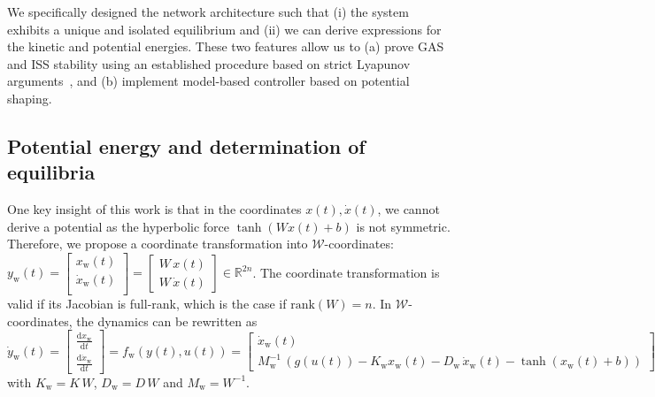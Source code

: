 We specifically designed the network architecture such that (i) the system exhibits a unique and isolated equilibrium and (ii) we can derive expressions for the kinetic and potential energies. These two features allow us to (a) prove \gls{GAS} and \gls{ISS} stability using an established procedure based on strict Lyapunov arguments~\cite{calzolari2020exponential, wu2022passive}, and (b) implement model-based controller based on potential shaping.

\subsection{Potential energy and determination of equilibria}

One key insight of this work is that in the coordinates $x(t), \dot{x}(t)$, we cannot derive a potential 
as the hyperbolic force $\tanh(W x(t) + b)$ is not symmetric. Therefore, we propose a coordinate transformation into $\mathcal{W}$-coordinates: $y_\mathrm{w}(t) = \begin{bmatrix}
    x_\mathrm{w}(t)\\
    \dot{x}_\mathrm{w}(t)\\
\end{bmatrix} = \begin{bmatrix}
    W \, x(t)\\
    W \, \dot{x}(t)
\end{bmatrix} \in \mathbb{R}^{2n}$. The coordinate transformation is valid if its Jacobian is full-rank, which is the case if $\mathrm{rank}(W) = n$.
In $\mathcal{W}$-coordinates, the dynamics can be rewritten as
\begin{equation}\label{eq:con:conw_dynamics}
    \dot{y}_\mathrm{w}(t) = \begin{bmatrix}
        \frac{\mathrm{d}x_\mathrm{w}}{\mathrm{d}t}\\
        \frac{\mathrm{d}\dot{x}_\mathrm{w}}{\mathrm{d}t}
    \end{bmatrix} = f_\mathrm{w}(y(t), u(t)) = \begin{bmatrix}
        \dot{x}_\mathrm{w}(t)\\
        M_\mathrm{w}^{-1} \, \left (g(u(t)) -K_\mathrm{w} x_\mathrm{w}(t) - D_\mathrm{w} \, \dot{x}_\mathrm{w}(t) - \tanh(x_\mathrm{w}(t) + b) \right )
    \end{bmatrix}
\end{equation}
with $K_\mathrm{w} = K \, W$, $D_\mathrm{w} = D \, W$ and $M_\mathrm{w} = W^{-1}$. 

